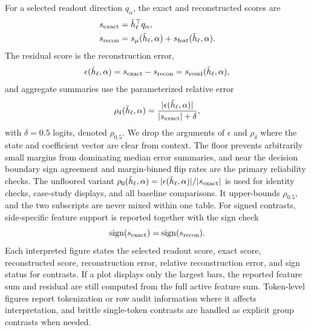 For a selected readout direction \(q_\alpha\), the exact and reconstructed
scores are
\[
\begin{aligned}
    s_{\mathrm{exact}}
    &=
    \tilde h_\ell^\top q_\alpha,\\
    s_{\mathrm{recon}}
    &=
    s_{\mu}(\tilde h_\ell,\alpha)
    +
    s_{\mathrm{feat}}(\tilde h_\ell,\alpha).
\end{aligned}
\]
The residual score is the reconstruction error,
\[
    \epsilon(\tilde h_\ell,\alpha)
    =
    s_{\mathrm{exact}}-s_{\mathrm{recon}}
    =
    s_{\mathrm{resid}}(\tilde h_\ell,\alpha),
\]
and aggregate summaries use the parameterized relative error
\[
    \rho_\delta(\tilde h_\ell,\alpha)
    =
    \frac{|\epsilon(\tilde h_\ell,\alpha)|}{|s_{\mathrm{exact}}|+\delta},
\]
with \(\delta=0.5\) logits, denoted \(\rho_{0.5}\).
We drop the arguments of \(\epsilon\) and \(\rho_\delta\) where the state and
coefficient vector are clear from context.
The floor prevents arbitrarily small margins from
dominating median error summaries, and near the decision boundary sign agreement and
margin-binned flip rates are the primary reliability checks. The unfloored
variant
\(\rho_0(\tilde h_\ell,\alpha)=|\epsilon(\tilde h_\ell,\alpha)|/|s_{\mathrm{exact}}|\)
is used for identity checks, case-study displays, and all
baseline comparisons. It upper-bounds \(\rho_{0.5}\), and the two subscripts are
never mixed within one table. For signed
contrasts, side-specific feature support is reported together with the sign check
\[
    \operatorname{sign}(s_{\mathrm{exact}})
    =
    \operatorname{sign}(s_{\mathrm{recon}}).
\]
Each interpreted figure states the selected readout score, exact score,
reconstructed score, reconstruction error, relative reconstruction error, and
sign status for contrasts. If a plot displays only the largest bars, the
reported feature sum and residual are still computed from the full active
feature sum. Token-level figures report tokenization or row audit
information where it affects interpretation, and brittle single-token contrasts are
handled as explicit group contrasts when needed.

